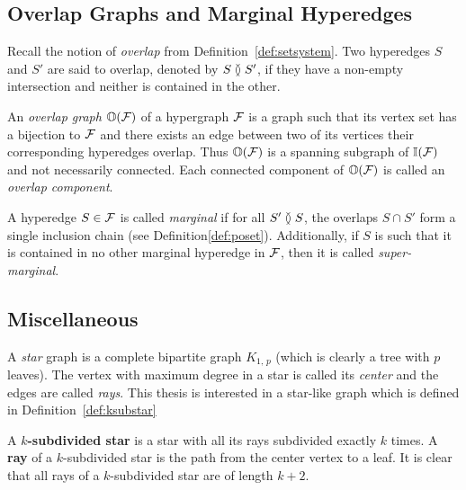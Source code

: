 
\subsection{Overlap Graphs and Marginal Hyperedges}
\label{sec:overlapmarginal}
Recall the notion of {\em overlap} from
Definition~\ref{def:setsystem}.  Two hyperedges $S$ and $S'$ are said
to overlap, denoted by $S \between S'$, if they have a non-empty
intersection and neither is contained in the other.

An {\em overlap graph}  $\mathbb O({\cal F})$ of a hypergraph ${\cal F}$ is a graph
such that its vertex set has a bijection to ${\cal F}$ and there exists an
edge between two of its vertices \iff their corresponding hyperedges
overlap.  Thus $\mathbb O({\cal F})$ is a spanning subgraph of $\mathbb I({\cal F})$ and not
necessarily connected. Each connected component of $\mathbb O({\cal F})$ is
called an {\em overlap component}.

A hyperedge $S \in {\cal F}$ is called {\em marginal} if for all $S'
\between S$, the overlaps $S \cap S'$ form a single inclusion chain
\cite{kklv10} (see Definition\ref{def:poset}). Additionally, if $S$ is
such that it is contained in no other marginal hyperedge in ${\cal F}$,
then it is called {\em super-marginal}.

\subsection{Miscellaneous}
\label{sec:miscprelim}
A {\em star} graph is a complete bipartite graph $K_{1,\,p}$ (which is
clearly a tree with $p$ leaves). The vertex with maximum degree in a
star is called its {\em center} and the edges are called {\em
  rays}. This thesis is interested in a star-like graph which is
defined in Definition~\ref{def:ksubstar}

\begin{definition}
  \label{def:ksubstar}
  A \textbf{$k$-subdivided star} is a star with all its rays subdivided
  exactly $k$ times. A \textbf{ray} of a $k$-subdivided star is the path
  from the center vertex to a leaf. It is clear that all rays of a
  $k$-subdivided star are of length $k+2$.
\end{definition}


